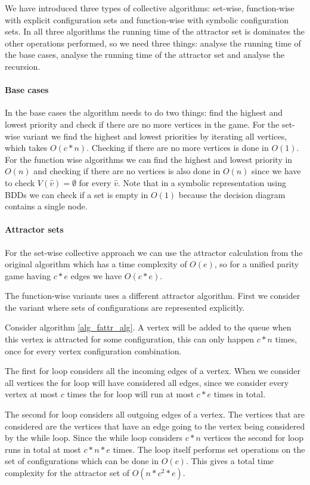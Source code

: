 We have introduced three types of collective algorithms: set-wise, function-wise with explicit configuration sets and function-wise with symbolic configuration sets. In all three algorithms the running time of the attractor set is dominates the other operations performed, so we need three things: analyse the running time of the base cases, analyse the running time of the attractor set and analyse the recursion.

\paragraph{Base cases} In the base cases the algorithm needs to do two things: find the highest and lowest priority and check if there are no more vertices in the game. For the set-wise variant we find the highest and lowest priorities by iterating all vertices, which takes $O(c*n)$. Checking if there are no more vertices is done in $O(1)$. For the function wise algorithms we can find the highest and lowest priority in $O(n)$ and checking if there are no vertices is also done in $O(n)$ since we have to check $V(\hat{v}) = \emptyset$ for every $\hat{v}$. Note that in a symbolic representation using BDDs we can check if a set is empty in $O(1)$ because the decision diagram contains a single node.

\paragraph{Attractor sets} For the set-wise collective approach we can use the attractor calculation from the original algorithm which has a time complexity of $O(e)$, so for a unified parity game having $c*e$ edges we have $O(c*e)$.

The function-wise variants uses a different attractor algorithm. First we consider the variant where sets of configurations are represented explicitly.

Consider algorithm \ref{alg_fattr_alg}. A vertex will be added to the queue when this vertex is attracted for some configuration, this can only happen $c*n$ times, once for every vertex configuration combination. 

The first for loop considers all the incoming edges of a vertex. When we consider all vertices the for loop will have considered all edges, since we consider every vertex at most $c$ times the for loop will run at most $c*e$ times in total.

The second for loop considers all outgoing edges of a vertex. The vertices that are considered are the vertices that have an edge going to the vertex being considered by the while loop. Since the while loop considers $c*n$ vertices the second for loop runs in total at most $c * n * e$ times. The loop itself performs set operations on the set of configurations which can be done in $O(c)$. This gives a total time complexity for the attractor set of $O(n*c^2*e)$.

